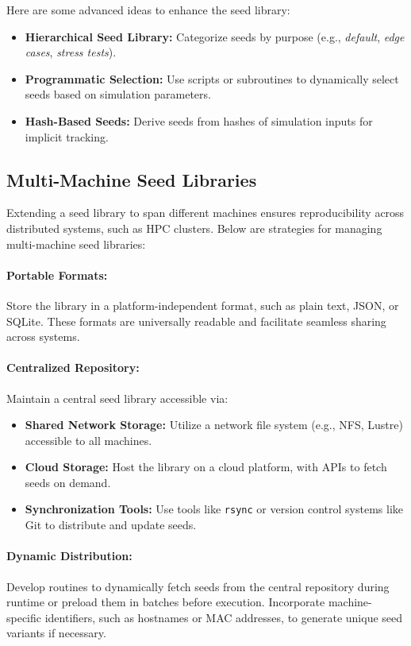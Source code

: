 \documentclass[12pt]{article}
\begin{document}
Here are some advanced ideas to enhance the seed library:
\begin{itemize}
    \item \textbf{Hierarchical Seed Library:} Categorize seeds by purpose (e.g., \emph{default}, \emph{edge cases}, \emph{stress tests}).
    \item \textbf{Programmatic Selection:} Use scripts or subroutines to dynamically select seeds based on simulation parameters.
    \item \textbf{Hash-Based Seeds:} Derive seeds from hashes of simulation inputs for implicit tracking.
\end{itemize}
\subsection{Multi-Machine Seed Libraries}

Extending a seed library to span different machines ensures reproducibility across distributed systems, such as HPC clusters. Below are strategies for managing multi-machine seed libraries:

\paragraph{Portable Formats:} Store the library in a platform-independent format, such as plain text, JSON, or SQLite. These formats are universally readable and facilitate seamless sharing across systems.

\paragraph{Centralized Repository:} Maintain a central seed library accessible via:
\begin{itemize}
    \item \textbf{Shared Network Storage:} Utilize a network file system (e.g., NFS, Lustre) accessible to all machines.
    \item \textbf{Cloud Storage:} Host the library on a cloud platform, with APIs to fetch seeds on demand.
    \item \textbf{Synchronization Tools:} Use tools like \texttt{rsync} or version control systems like Git to distribute and update seeds.
\end{itemize}

\paragraph{Dynamic Distribution:} Develop routines to dynamically fetch seeds from the central repository during runtime or preload them in batches before execution. Incorporate machine-specific identifiers, such as hostnames or MAC addresses, to generate unique seed variants if necessary.
\end{document}
